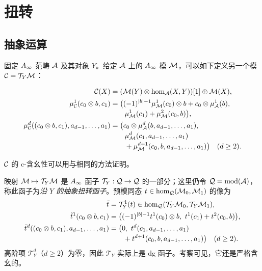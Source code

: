 \section{扭转}\label{sec:5}
\subsection{抽象运算}\label{sec:5a}
固定 $A_\infty$ 范畴 $\mathcal A$ 及其对象 $Y$。给定 $\mathcal A$ 上的 $A_\infty$ 模 $\mathcal M$，可以如下定义另一个模 $\mathcal C=\mathcal T_Y\mathcal M$：
\begin{definition*}

\begin{equation}\label{eq:5.1}
\begin{aligned}
\mathcal C(X)&=(\mathcal M(Y)\otimes\hom_{\mathcal A}(X,Y))[1]\oplus\mathcal M(X),\\
\mu^1_{\mathcal C}(c_0\otimes b,c_1)
&=\bigl((-1)^{|b|-1}\mu^1_{\mathcal M}(c_0)\otimes b+c_0\otimes\mu^1_{\mathcal A}(b),\\[-2pt]
&\qquad\mu^1_{\mathcal M}(c_1)+\mu^2_{\mathcal M}(c_0,b)\bigr),\\
\mu^d_{\mathcal C}((c_0\otimes b,c_1),a_{d-1},\ldots,a_1)
&=\bigl(c_0\otimes\mu^d_{\mathcal A}(b,a_{d-1},\ldots,a_1),\\[-2pt]
&\qquad\mu^d_{\mathcal M}(c_1,a_{d-1},\ldots,a_1)\\[-2pt]
&\qquad+\mu^{d+1}_{\mathcal M}(c_0,b,a_{d-1},\ldots,a_1)\bigr)\quad(d\geq2).
\end{aligned}
\end{equation}
\end{definition*}
$\mathcal C$ 的 c-含幺性可以用与相同的方法证明。

映射 $\mathcal M\mapsto\mathcal T_Y\mathcal M$ 是 $A_\infty$ 函子 $\mathcal T_Y:\mathcal Q\to\mathcal Q$ 的一部分；这里仍令 $\mathcal Q=\operatorname{mod}(\mathcal A)$，称此函子为\emph{沿 $Y$ 的抽象扭转函子}。预模同态 $t\in\hom_{\mathcal Q}(\mathcal M_0,\mathcal M_1)$ 的像为
\[
\begin{aligned}
\tilde t&=\mathcal T_Y^1(t)\in\hom_{\Q}(\mathcal T_Y\M_0,\mathcal T_Y\M_1),\\
\tilde t^1(c_0\otimes b,c_1)&=\bigl((-1)^{|b|-1}t^1(c_0)\otimes b,\ t^1(c_1)+t^2(c_0,b)\bigr),\\
\tilde t^d((c_0\otimes b,c_1),a_{d-1},\ldots,a_1)
&=\bigl(0,\ t^d(c_1,a_{d-1},\ldots,a_1)\\[-2pt]
&\qquad+t^{d+1}(c_0,b,a_{d-1},\ldots,a_1)\bigr)\quad(d\geq2).
\end{aligned}
\]
高阶项 $\mathcal T_Y^d$（$d\geq2$）为零，因此 $\mathcal T_Y$ 实际上是 dg 函子。考察可见，它还是严格含幺的。

